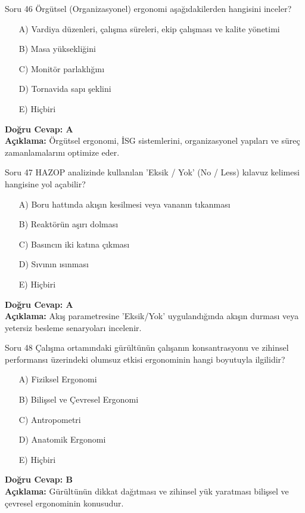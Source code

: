 \documentclass[12pt,a4paper]{article}
\begin{document}
\begin{testcard}{Soru 46}
    Örgütsel (Organizasyonel) ergonomi aşağıdakilerden hangisini inceler?
    \begin{itemize}
        \item[A)] Vardiya düzenleri, çalışma süreleri, ekip çalışması ve kalite yönetimi
        \item[B)] Masa yüksekliğini
        \item[C)] Monitör parlaklığını
        \item[D)] Tornavida sapı şeklini
        \item[E)] Hiçbiri
    \end{itemize}
    \tcblower
    \textbf{Doğru Cevap: A} \\
    \textbf{Açıklama:} Örgütsel ergonomi, İSG sistemlerini, organizasyonel yapıları ve süreç zamanlamalarını optimize eder.
\end{testcard}

\begin{testcard}{Soru 47}
    HAZOP analizinde kullanılan 'Eksik / Yok' (No / Less) kılavuz kelimesi hangisine yol açabilir?
    \begin{itemize}
        \item[A)] Boru hattında akışın kesilmesi veya vananın tıkanması
        \item[B)] Reaktörün aşırı dolması
        \item[C)] Basıncın iki katına çıkması
        \item[D)] Sıvının ısınması
        \item[E)] Hiçbiri
    \end{itemize}
    \tcblower
    \textbf{Doğru Cevap: A} \\
    \textbf{Açıklama:} Akış parametresine 'Eksik/Yok' uygulandığında akışın durması veya yetersiz besleme senaryoları incelenir.
\end{testcard}

\begin{testcard}{Soru 48}
    Çalışma ortamındaki gürültünün çalışanın konsantrasyonu ve zihinsel performansı üzerindeki olumsuz etkisi ergonominin hangi boyutuyla ilgilidir?
    \begin{itemize}
        \item[A)] Fiziksel Ergonomi
        \item[B)] Bilişsel ve Çevresel Ergonomi
        \item[C)] Antropometri
        \item[D)] Anatomik Ergonomi
        \item[E)] Hiçbiri
    \end{itemize}
    \tcblower
    \textbf{Doğru Cevap: B} \\
    \textbf{Açıklama:} Gürültünün dikkat dağıtması ve zihinsel yük yaratması bilişsel ve çevresel ergonominin konusudur.
\end{testcard}
\end{document}
